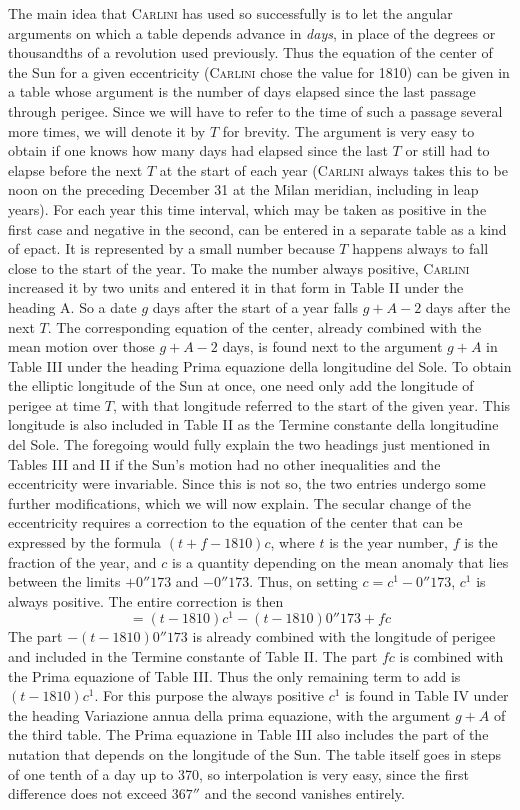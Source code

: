 The main idea that \textsc{Carlini} has used so successfully is to let the angular arguments on which a table depends advance in \emph{days}, in place of the degrees or thousandths of a revolution used previously. Thus the equation of the center of the Sun for a given eccentricity (\textsc{Carlini} chose the value for 1810) can be given in a table whose argument is the number of days elapsed since the last passage through perigee. Since we will have to refer to the time of such a passage several more times, we will denote it by $T$ for brevity. The argument is very easy to obtain if one knows how many days had elapsed since the last $T$ or still had to elapse before the next $T$ at the start of each year (\textsc{Carlini} always takes this to be noon on the preceding December 31 at the Milan meridian, including in leap years). For each year this time interval, which may be taken as positive in the first case and negative in the second, can be entered in a separate table as a kind of epact. It is represented by a small number because $T$ happens always to fall close to the start of the year. To make the number always positive, \textsc{Carlini} increased it by two units and entered it in that form in Table II under the heading A. So a date $g$ days after the start of a year falls $g+A-2$ days after the next $T$. The corresponding equation of the center, already combined with the mean motion over those $g+A-2$ days, is found next to the argument $g+A$ in Table III under the heading Prima equazione della longitudine del Sole. To obtain the elliptic longitude of the Sun at once, one need only add the longitude of perigee at time $T$, with that longitude referred to the start of the given year. This longitude is also included in Table II as the Termine constante della longitudine del Sole. The foregoing would fully explain the two headings just mentioned in Tables III and II if the Sun's motion had no other inequalities and the eccentricity were invariable. Since this is not so, the two entries undergo some further modifications, which we will now explain. The secular change of the eccentricity requires a correction to the equation of the center that can be expressed by the formula $(t+f-1810)c$, where $t$ is the year number, $f$ is the fraction of the year, and $c$ is a quantity depending on the mean anomaly that lies between the limits $+0''173$ and $-0''173$. Thus, on setting $c = c^1 - 0''173$, $c^1$ is always positive. The entire correction is then \[ = (t-1810)c^1 - (t-1810)0''173 + fc \] The part $-(t-1810)0''173$ is already combined with the longitude of perigee and included in the Termine constante of Table II. The part $fc$ is combined with the Prima equazione of Table III. Thus the only remaining term to add is $(t-1810)c^1$. For this purpose the always positive $c^1$ is found in Table IV under the heading Variazione annua della prima equazione, with the argument $g+A$ of the third table. The Prima equazione in Table III also includes the part of the nutation that depends on the longitude of the Sun. The table itself goes in steps of one tenth of a day up to 370, so interpolation is very easy, since the first difference does not exceed $367''$ and the second vanishes entirely.

